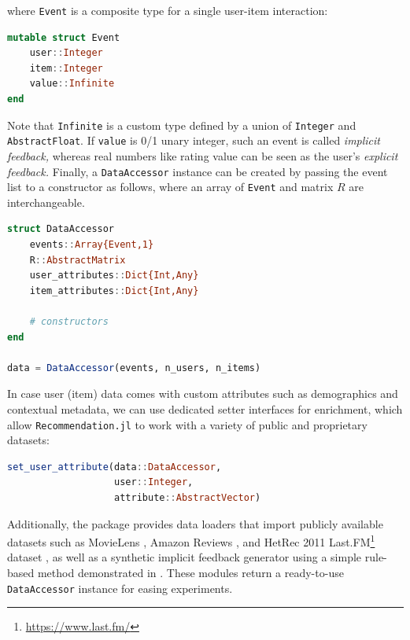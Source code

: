 where \texttt{Event} is a composite type for a single user-item interaction:

\begin{lstlisting}[language = Julia]
mutable struct Event
    user::Integer
    item::Integer
    value::Infinite
end
\end{lstlisting}

Note that \texttt{Infinite} is a custom type defined by a union of \texttt{Integer} and \texttt{AbstractFloat}. If \texttt{value} is 0/1 unary integer, such an event is called \textit{implicit feedback,} whereas real numbers like rating value can be seen as the user's \textit{explicit feedback.} Finally, a \texttt{DataAccessor} instance can be created by passing the event list to a constructor as follows, where an array of \texttt{Event} and matrix $R$ are interchangeable.

\begin{lstlisting}[language = Julia]
struct DataAccessor
    events::Array{Event,1}
    R::AbstractMatrix
    user_attributes::Dict{Int,Any}
    item_attributes::Dict{Int,Any}
    
    # constructors
end

data = DataAccessor(events, n_users, n_items)
\end{lstlisting}

In case user (item) data comes with custom attributes such as demographics and contextual metadata, we can use dedicated setter interfaces for enrichment, which allow \texttt{Recommendation.jl} to work with a variety of public and proprietary datasets:

\begin{lstlisting}[language = Julia]
set_user_attribute(data::DataAccessor, 
                   user::Integer, 
                   attribute::AbstractVector)
\end{lstlisting}

Additionally, the package provides data loaders that import publicly available datasets such as MovieLens \cite{harper2015movielens}, Amazon Reviews \cite{ni2019justifying}, and HetRec 2011 Last.FM\footnote{\url{https://www.last.fm/}} dataset \cite{Cantador:RecSys2011}, as well as a synthetic implicit feedback generator using a simple rule-based method demonstrated in \cite{Aharon2013}. These modules return a ready-to-use \texttt{DataAccessor} instance for easing experiments.
